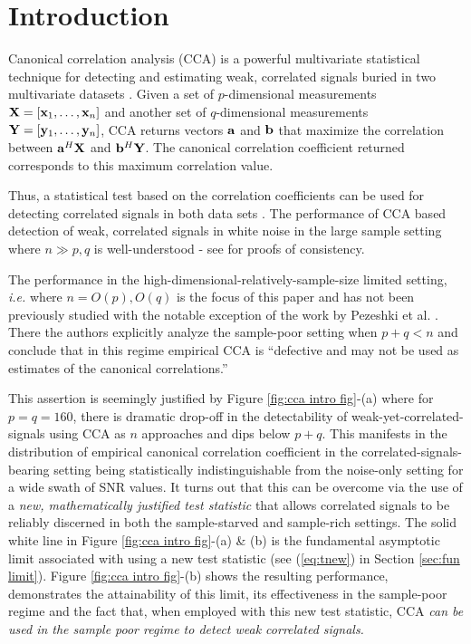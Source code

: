 \documentclass[conference]{IEEEtran}
\begin{document}
\section{Introduction}

Canonical correlation analysis (CCA) is a powerful multivariate statistical technique for detecting and estimating weak, correlated signals buried in two multivariate datasets \cite{hotelling1936relations}. Given a set of $p$-dimensional measurements ${\bf X} = [{\bf x}_{1}, \ldots, {\bf x}_{n}]$ and another set of $q$-dimensional measurements ${\bf Y} = [{\bf y}_{1}, \ldots, {\bf y}_{n}]$, CCA returns vectors ${\bf a}$ and ${\bf b}$ that maximize the correlation between ${\bf a}^{H} {\bf X}$ and ${\bf b}^{H} {\bf Y}$. The canonical correlation coefficient returned corresponds to this maximum correlation value.

Thus, a statistical test based on the correlation coefficients can be used for detecting correlated signals in both data sets \cite{akaike1976canonical}. The performance of CCA based detection of weak, correlated signals in white noise in the large sample setting where $n \gg p, q$ is well-understood - see \cite{gunderson1997estimating} for proofs of consistency.

The performance in the high-dimensional-relatively-sample-size limited setting, \textit{i.e.} where $n = O(p), O(q)$ is the focus of this paper and has not been previously studied with the notable exception of the work by Pezeshki et al. \cite{pezeshki2005empirical}. There the authors explicitly analyze the sample-poor setting when $p+q<n$ and conclude that in this regime empirical CCA is ``defective and may not be used as estimates of the canonical correlations.''

This assertion is seemingly justified by Figure \ref{fig:cca intro fig}-(a) where for $p = q = 160$, there is dramatic drop-off in the detectability of weak-yet-correlated-signals using CCA as $n$ approaches and dips below $p+q$. This manifests in the distribution of empirical canonical correlation coefficient in the correlated-signals-bearing setting being statistically indistinguishable from the noise-only setting for a wide swath of SNR values. It turns out that this can be overcome via the use of a \textit{new, mathematically justified test statistic} that allows correlated signals to be reliably discerned in both the sample-starved and sample-rich settings.  The solid white line in Figure \ref{fig:cca intro fig}-(a) \& (b) is the fundamental asymptotic limit associated with using a new test statistic (see (\ref{eq:tnew}) in Section \ref{sec:fun limit}). Figure \ref{fig:cca intro fig}-(b) shows the resulting performance, demonstrates the attainability of this limit, its effectiveness in the sample-poor regime and the fact that, when employed with this new test statistic, CCA \textit{can be used in the sample poor regime to detect weak correlated signals.}
\end{document}
